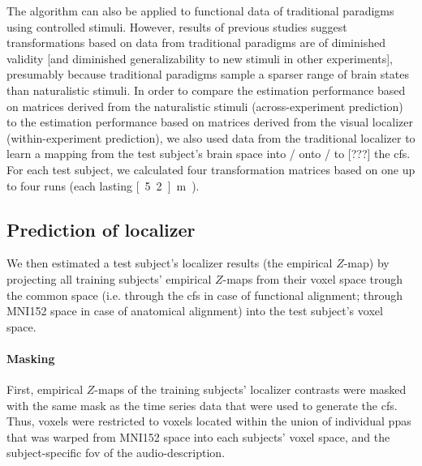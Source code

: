 The algorithm can also be applied to functional data of traditional paradigms
using controlled stimuli.
%
However, results of previous studies \citep{guntupalli2016model,
haxby2011common} suggest transformations based on data from traditional
paradigms are of diminished validity [and diminished generalizability to new
stimuli in other experiments], presumably because traditional paradigms sample a
sparser range of brain states than naturalistic stimuli.
%
In order to compare the estimation performance based on matrices derived from
the naturalistic stimuli (across-experiment prediction) to the estimation
performance based on matrices derived from the visual localizer
(within-experiment prediction), we also used data from the traditional localizer
to learn a mapping from the test subject's brain space into / onto / to [???]
the \ac{cfs}.
%
For each test subject, we calculated four transformation matrices based on one
up to four runs (each lasting \unit[5.2]{m}).



\subsection{Prediction of localizer}


We then estimated a test subject's localizer results (the empirical $Z$-map) by
projecting all training subjects' empirical $Z$-maps from their voxel space
trough the common space (i.e. through the \ac{cfs} in case of functional
alignment; through MNI152 space in case of anatomical alignment) into the test
subject's voxel space.


\paragraph{Masking}
%
First, empirical $Z$-maps of the training subjects' localizer contrasts were
masked with the same mask as the time series data that were used to generate the
\ac{cfs}.
%
Thus, voxels were restricted to voxels located within the union of individual
\acp{ppa} \citep[s.][]{haeusler2022processing} that was warped from MNI152 space
into each subjects' voxel space, and
the subject-specific \ac{fov} of the audio-description.


